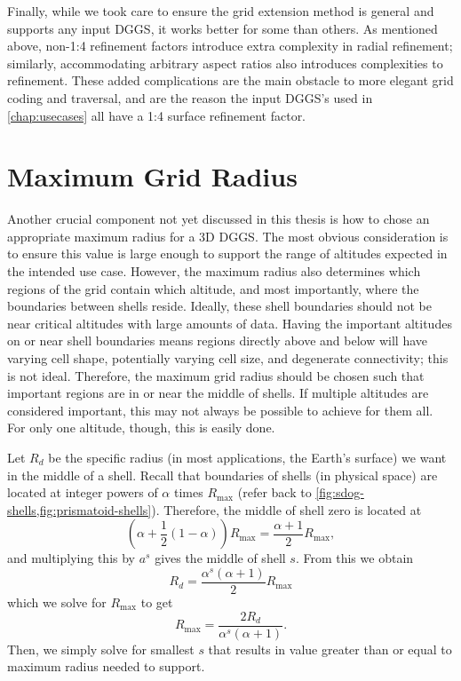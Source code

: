 Finally, while we took care to ensure the grid extension method is general and supports any input DGGS, it works better for some than others.
As mentioned above, non-1:4 refinement factors introduce extra complexity in radial refinement; similarly, accommodating arbitrary aspect ratios also introduces complexities to refinement.
These added complications are the main obstacle to more elegant grid coding and traversal, and are the reason the input DGGS's used in \cref{chap:usecases} all have a 1:4 surface refinement factor.

\section{Maximum Grid Radius}
Another crucial component not yet discussed in this thesis is how to chose an appropriate maximum radius for a 3D DGGS.
The most obvious consideration is to ensure this value is large enough to support the range of altitudes expected in the intended use case.
However, the maximum radius also determines which regions of the grid contain which altitude, and most importantly, where the boundaries between shells reside.
Ideally, these shell boundaries should not be near critical altitudes with large amounts of data.
Having the important altitudes on or near shell boundaries means regions directly above and below will have varying cell shape, potentially varying cell size, and degenerate connectivity; this is not ideal.
Therefore, the maximum grid radius should be chosen such that important regions are in or near the middle of shells.
If multiple altitudes are considered important, this may not always be possible to achieve for them all.
For only one altitude, though, this is easily done.

Let $R_d$ be the specific radius (in most applications, the Earth's surface) we want in the middle of a shell.
Recall that boundaries of shells (in physical space) are located at integer powers of $\alpha$ times $R_\mathrm{max}$ (refer back to \cref{fig:sdog-shells,fig:prismatoid-shells}).
Therefore, the middle of shell zero is located at
%
\begin{equation*}
\left( \alpha + \frac{1}{2} (1 -\alpha) \right) R_\mathrm{max} = \frac{ \alpha + 1 }{2} R_\mathrm{max},
\end{equation*}
%
and multiplying this by $a^s$ gives the middle of shell $s$.
From this we obtain
%
\begin{equation*}
R_d = \frac{ \alpha^s \left( \alpha + 1 \right) }{2} R_\mathrm{max}
\end{equation*}
%
which we solve for $R_\mathrm{max}$ to get
%
\begin{equation*}
R_\mathrm{max} = \frac{2 R_d}{ \alpha^s \left( \alpha + 1 \right) }.
\end{equation*}
%
Then, we simply solve for smallest $s$ that results in value greater than or equal to maximum radius needed to support.
